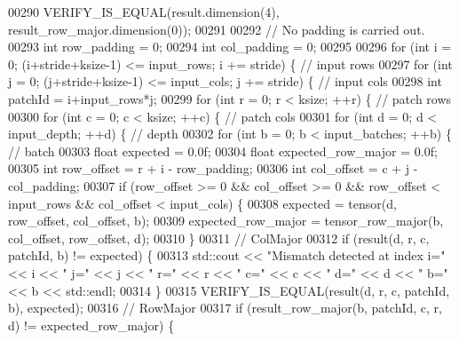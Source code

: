 \begin{DoxyCode}
00290   VERIFY\_IS\_EQUAL(result.dimension(4), result\_row\_major.dimension(0));
00291 
00292   \textcolor{comment}{// No padding is carried out.}
00293   \textcolor{keywordtype}{int} row\_padding = 0;
00294   \textcolor{keywordtype}{int} col\_padding = 0;
00295 
00296   \textcolor{keywordflow}{for} (\textcolor{keywordtype}{int} i = 0; (i+stride+ksize-1) <= input\_rows; i += stride) \{  \textcolor{comment}{// input rows}
00297     \textcolor{keywordflow}{for} (\textcolor{keywordtype}{int} j = 0; (j+stride+ksize-1) <= input\_cols; j += stride) \{  \textcolor{comment}{// input cols}
00298       \textcolor{keywordtype}{int} patchId = i+input\_rows*j;
00299       \textcolor{keywordflow}{for} (\textcolor{keywordtype}{int} r = 0; r < ksize; ++r) \{  \textcolor{comment}{// patch rows}
00300         \textcolor{keywordflow}{for} (\textcolor{keywordtype}{int} c = 0; c < ksize; ++c) \{  \textcolor{comment}{// patch cols}
00301           \textcolor{keywordflow}{for} (\textcolor{keywordtype}{int} d = 0; d < input\_depth; ++d) \{  \textcolor{comment}{// depth}
00302             \textcolor{keywordflow}{for} (\textcolor{keywordtype}{int} b = 0; b < input\_batches; ++b) \{  \textcolor{comment}{// batch}
00303               \textcolor{keywordtype}{float} expected = 0.0f;
00304               \textcolor{keywordtype}{float} expected\_row\_major = 0.0f;
00305               \textcolor{keywordtype}{int} row\_offset = r + i - row\_padding;
00306               \textcolor{keywordtype}{int} col\_offset = c + j - col\_padding;
00307               \textcolor{keywordflow}{if} (row\_offset >= 0 && col\_offset >= 0 && row\_offset < input\_rows && col\_offset < input\_cols)
       \{
00308                 expected = tensor(d, row\_offset, col\_offset, b);
00309                 expected\_row\_major = tensor\_row\_major(b, col\_offset, row\_offset, d);
00310               \}
00311               \textcolor{comment}{// ColMajor}
00312               \textcolor{keywordflow}{if} (result(d, r, c, patchId, b) != expected) \{
00313                 std::cout << \textcolor{stringliteral}{"Mismatch detected at index i="} << i << \textcolor{stringliteral}{" j="} << j << \textcolor{stringliteral}{" r="} << r << \textcolor{stringliteral}{" c="} << c
       << \textcolor{stringliteral}{" d="} << d << \textcolor{stringliteral}{" b="} << b << std::endl;
00314               \}
00315               VERIFY\_IS\_EQUAL(result(d, r, c, patchId, b), expected);
00316               \textcolor{comment}{// RowMajor}
00317               \textcolor{keywordflow}{if} (result\_row\_major(b, patchId, c, r, d) != expected\_row\_major) \{

\end{DoxyCode}
